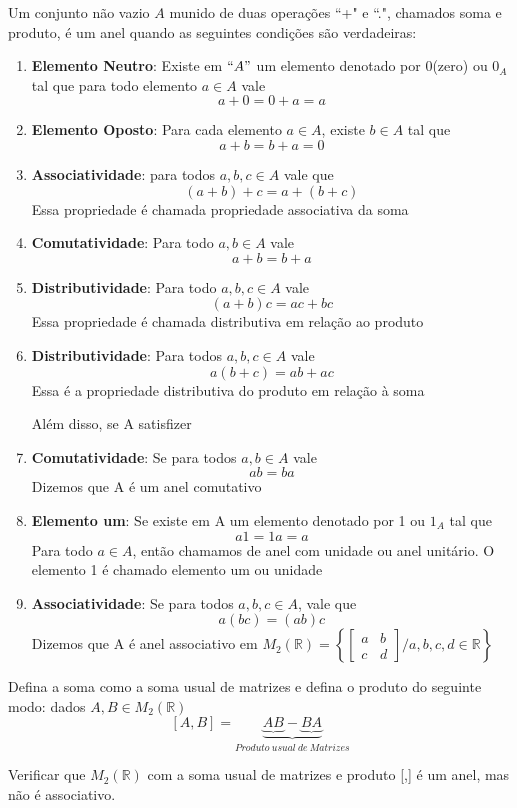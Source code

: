 \begin{definicao}[Anel] Um conjunto n{\~a}o vazio $A$ munido de duas opera{\c c}{\~o}es ``+" e ``.", chamados soma e produto, {\'e} um anel quando as seguintes condi{\c c}{\~o}es s{\~a}o verdadeiras:
\begin{enumerate}
\item \textbf{Elemento Neutro}: Existe em $``A"$ um elemento denotado por 0(zero) ou $0_{A}$ tal que para todo elemento $a\in A$ vale
\[a+0=0+a=a\]
\item \textbf{Elemento Oposto}: Para cada elemento $a\in A$, existe $b\in A$ tal que
\[a+b=b+a=0\]
\item \textbf{Associatividade}: para todos $a,b,c\in A$ vale que
\[(a+b)+c=a+(b+c)\]
Essa propriedade {\'e} chamada propriedade associativa da soma
\item \textbf{Comutatividade}: Para todo $a,b\in A$ vale
\[a+b=b+a\]
\item \textbf{Distributividade}: Para todo $a,b,c\in A$ vale
\[(a+b)c=ac+bc\]
Essa propriedade {\'e} chamada distributiva em rela{\c c}{\~a}o ao produto
\item \textbf{Distributividade}: Para todos $a,b,c\in A$ vale
\[a(b+c)=ab+ac\]
Essa {\'e} a propriedade distributiva do produto em rela{\c c}{\~a}o {\`a} soma

Al{\'e}m disso, se A satisfizer
\item \textbf{Comutatividade}: Se para todos $a,b\in A$ vale
\[ab=ba\]
Dizemos que A {\'e} um anel comutativo
\item \textbf{Elemento um}: Se existe em A um elemento denotado por 1 ou $1_{A}$ tal que
\[a1=1a=a\]
Para todo $a\in A$, ent{\~a}o chamamos de anel com unidade ou anel unit{\'a}rio. O elemento 1 {\'e} chamado elemento um ou unidade
\item \textbf{Associatividade}: Se para todos $a,b,c\in A$, vale que
\[a(bc)=(ab)c\]
Dizemos que A {\'e} anel associativo em $M_{2}(\mathbb{R})=\left\{\left[\begin{array}{cc}
a & b\\
c & d
\end{array}\right]/a,b,c,d\in\mathbb{R}\right\}$
\end{enumerate}
\end{definicao}
Defina a soma como a soma usual de matrizes e defina o produto do seguinte modo: dados $A,B\in M_{2}(\mathbb{R})$
\[[A,B]=\underbrace{\underbrace{AB}-\underbrace{BA}}_{Produto\ usual\ de\ Matrizes}\]

Verificar que $M_{2}(\mathbb{R})$ com a soma usual de matrizes e produto [,] {\'e} um anel, mas n{\~a}o {\'e} associativo.

